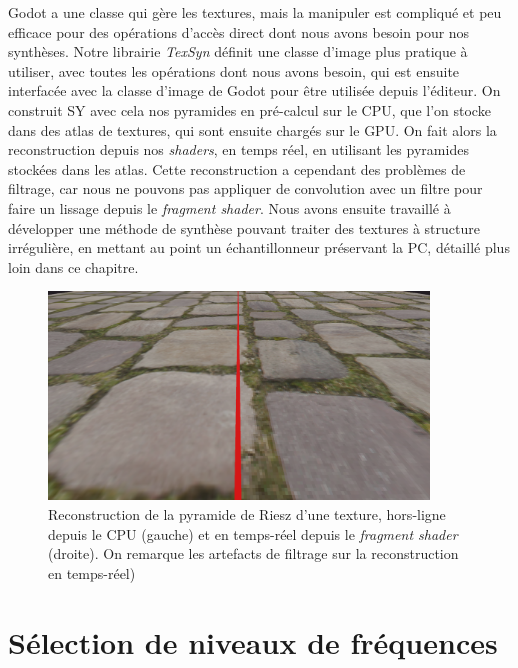 \bigskip

Godot a une classe qui gère les textures, mais la manipuler est compliqué et peu efficace pour des opérations d'accès direct dont nous avons besoin pour nos synthèses. Notre librairie \textit{TexSyn} définit une classe d'image plus pratique à utiliser, avec toutes les opérations dont nous avons besoin, qui est ensuite interfacée avec la classe d'image de Godot pour être utilisée depuis l'éditeur. On construit SY avec cela nos pyramides en pré-calcul sur le CPU, que l'on stocke dans des atlas de textures, qui sont ensuite chargés sur le GPU. On fait alors la reconstruction depuis nos \textit{shaders}, en temps réel, en utilisant les pyramides stockées dans les atlas. Cette reconstruction a cependant des problèmes de filtrage, car nous ne pouvons pas appliquer de convolution avec un filtre pour faire un lissage depuis le \textit{fragment shader}. Nous avons ensuite travaillé à développer une méthode de synthèse pouvant traiter des textures à structure irrégulière, en mettant au point un échantillonneur préservant la PC, détaillé plus loin dans ce chapitre.

\begin{figure}
    \centering
    \includegraphics[width=0.9\textwidth]{contenu/resources/images/reconstruction_cpu_vs_gpu}
    \caption[Reconstruction de texture dans \textit{TexSyn}]{Reconstruction de la pyramide de Riesz d'une texture, hors-ligne depuis le CPU (gauche) et en temps-réel depuis le \textit{fragment shader} (droite). On remarque les artefacts de filtrage sur la reconstruction en temps-réel)}
    \label{fig:texsyn-reconstruction}
\end{figure}


\section{Sélection de niveaux de fréquences}

